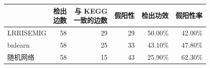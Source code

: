 \begin{table}[htbp]
\centering\small
{}
\begin{tabular}{lrrrrr}
\toprule
&\shortstack{检出\\边数}&\shortstack{与 KEGG\\一致的边数}&假阳性&检出功效&假阳性率\\
\midrule
LRRISEMIG&58&29&29&50.00\%&42.00\%\\
bnlearn&58&25&33&43.10\%&47.80\%\\
随机网络&58&15&43&25.90\%&62.30\%\\
\bottomrule
\end{tabular}
\end{table}
